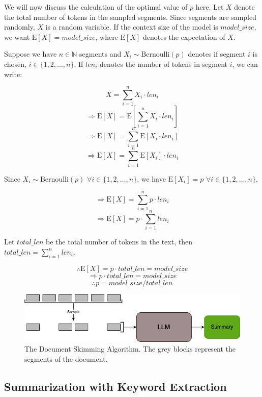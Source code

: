 		We will now discuss the calculation of the optimal value of $p$ here.
		Let $X$ denote the total number of tokens in the sampled segments.
		Since segments are sampled randomly, $X$ is a random variable.
		If the context size of the model is $model\_size$, we want $\mathrm{E}[X] = model\_size$,
		where $\mathrm{E}[X]$ denotes the expectation of $X$.

		Suppose we have $n \in \mathbb{N}$ segments and $X_i \sim \mathrm{Bernoulli}(p)$ denotes
		if segment $i$ is chosen, $i \in \{1, 2, \dots, n\}$.
		If $len_i$ denotes the number of tokens in segment $i$, we can write:

		\[ X = \sum_{i = 1}^{n} X_i \cdot len_i \]
		\[ \Rightarrow \mathrm{E}[X] = \mathrm{E}[\sum_{i = 1}^{n} X_i \cdot len_i] \]
		\[ \Rightarrow \mathrm{E}[X] = \sum_{i = 1}^{n} \mathrm{E}[X_i \cdot len_i] \]
		\[ \Rightarrow \mathrm{E}[X] = \sum_{i = 1}^{n} \mathrm{E}[X_i] \cdot len_i \]

		Since $X_i \sim \mathrm{Bernoulli}(p)$ $\forall i \in \{1, 2, \dots, n\}$, we
		have $\mathrm{E}[X_i] = p$ $\forall i \in \{1, 2, \dots, n\}$.

		\[ \Rightarrow \mathrm{E}[X] = \sum_{i = 1}^{n} p \cdot len_i \]
		\[ \Rightarrow \mathrm{E}[X] = p \cdot \sum_{i = 1}^{n} len_i \]

		Let $total\_len$ be the total number of tokens in the text, then
		$total\_len = \sum_{i = 1}^{n} len_i$.

		\[ \therefore \mathrm{E}[X] = p \cdot total\_len = model\_size \]
		\[ \Rightarrow p \cdot total\_len = model\_size \]
		\[ \therefore p = model\_size / total\_len \]

		\begin{figure}[!ht]
			\centering
			\includegraphics[width=.8\textwidth]{Images/doc-skim.png}
			\caption{The Document Skimming Algorithm. The grey blocks represent the segments
			of the document.}
			\label{fig:doc-skim}
		\end{figure}


	\subsection{Summarization with Keyword Extraction}
		\label{method:keyword}

